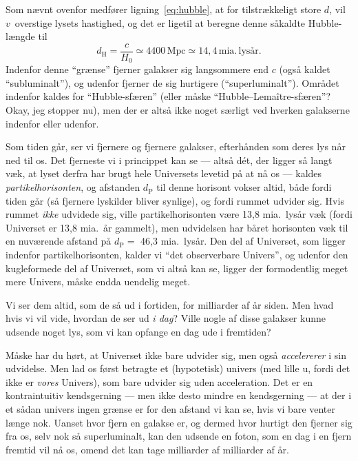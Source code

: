 \documentclass[useAMS,danish]{aa}
\def\vrec{\mbox{$v$}}
\begin{document}
Som nævnt ovenfor medfører ligning~\ref{eq:hubble}, at for tilstrækkeligt store $d$, vil \vrec\ overstige lysets hastighed, og det er ligetil at beregne denne såkaldte Hubble-længde til
\begin{equation}
    \label{eq:dH}
    d_\mathrm{H} = \frac{c}{H_0}
                \simeq 4400\,\mathrm{Mpc}
                \simeq 14,4\,\mathrm{mia.\,lysår}.
\end{equation}
Indenfor denne ``grænse'' fjerner galakser sig langsommere end $c$ (også kaldet ``subluminalt''), og udenfor fjerner de sig hurtigere (``superluminalt'').
Området indenfor kaldes for ``Hubble-sfæren'' (eller måske ``Hubble--Lemaître-sfæren''? Okay, jeg stopper nu), men der er altså ikke noget særligt ved hverken galakserne indenfor eller udenfor.

Som tiden går, ser vi fjernere og fjernere galakser, efterhånden som deres lys når ned til os.
Det fjerneste vi i princippet kan se --- altså dét, der ligger så langt væk, at lyset derfra har brugt hele Universets levetid på at nå os --- kaldes \emph{partikelhorisonten}, og afstanden $d_\mathrm{P}$ til denne horisont vokser altid, både fordi tiden går (så fjernere lyskilder bliver synlige), og fordi rummet udvider sig.
Hvis rummet \emph{ikke} udvidede sig, ville partikelhorisonten være 13,8 mia.~lysår væk (fordi Universet er 13,8 mia.~år gammelt), men udvidelsen har båret horisonten væk til en nuværende afstand på $d_\mathrm{P} =$ 46,3 mia.~lysår.
Den del af Universet, som ligger indenfor partikelhorisonten, kalder vi ``det observerbare Univers'', og udenfor den kugleformede del af Universet, som vi altså kan se, ligger der formodentlig meget mere Univers, måske endda uendelig meget.
%
\begin{figure}
    \caption*{{\sf {}}}
\end{figure}
%
Vi ser dem altid, som de så ud i fortiden, for milliarder af år siden.
Men hvad hvis vi vil vide, hvordan de ser ud \emph{i dag}?
Ville nogle af disse galakser kunne udsende noget lys, som vi kan opfange en dag ude i fremtiden?

Måske har du hørt, at Universet ikke bare udvider sig, men også \emph{accelererer} i sin udvidelse.
Men lad os først betragte et (hypotetisk) univers (med lille u, fordi det ikke er \emph{vores} Univers), som bare udvider sig uden acceleration.
Det er en kontraintuitiv kendsgerning --- men ikke desto mindre en kendsgerning --- at der i et sådan univers ingen grænse er for den afstand vi kan se, hvis vi bare venter længe nok.
Uanset hvor fjern en galakse er, og dermed hvor hurtigt den fjerner sig fra os, selv nok så superluminalt, kan den udsende en foton, som en dag i en fjern fremtid vil nå os, omend det kan tage milliarder af milliarder af år.
\end{document}

